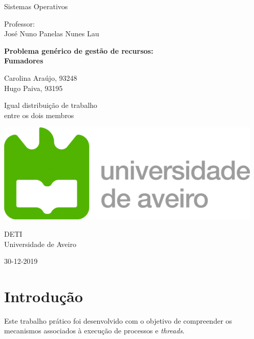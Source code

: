 \documentclass[10pt,portuguese]{article}
\begin{document}
\begin{titlepage}
	\clearpage\thispagestyle{empty}
	\centering
	\vspace{2cm}

	
	{\Large  Sistemas Operativos \par}
	\vspace{0.5cm}
	{\small Professor: \\
	José Nuno Panelas Nunes Lau\par}
	\vspace{4cm}
	{ \textbf{Problema genérico de gestão de recursos:}} \\
	\vspace{0.5cm}
	{\Huge \textbf{Fumadores}} \\
	\vspace{1cm}
	\vspace{4cm}
	{\normalsize Carolina Araújo, 93248 \\ 
	             Hugo Paiva, 93195
	   \par}
	   	{\tiny
	Igual distribuição de trabalho \\entre os dois membros\par}
	\vspace{2cm}

    \includegraphics[scale=0.20]{images/logo_ua.png}
    
    \vspace{2cm}
    
	{\normalsize DETI \\ 
		Universidade de Aveiro \par}
		
	{\normalsize 30-12-2019 \par}
	\vspace{2cm}
		
	
	\pagebreak

\end{titlepage}
\tableofcontents{}
\clearpage

\section{Introdução}
\par Este trabalho prático foi desenvolvido com o objetivo de compreender os mecanismos associados à execução de processos e \textit{threads}. 
\end{document}
